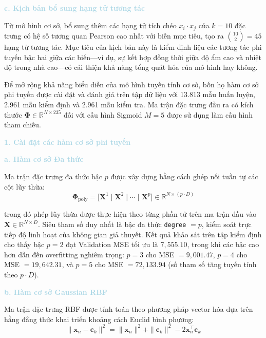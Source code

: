 \noindent\textcolor{lightblue}{\textbf{c. Kịch bản bổ sung hạng tử tương tác}}

Từ mô hình cơ sở, bổ sung thêm các hạng tử tích chéo $x_i \cdot x_j$
của $k=10$ đặc trưng có hệ số tương quan Pearson cao nhất với biến mục
tiêu, tạo ra $\binom{10}{2} = 45$ hạng tử tương tác. Mục tiêu của kịch
bản này là kiểm định liệu các tương tác phi tuyến bậc hai giữa các
biến---ví dụ, sự kết hợp đồng thời giữa độ ẩm cao và nhiệt độ trong nhà
cao---có cải thiện khả năng tổng quát hóa của mô hình hay không.

Để mở rộng khả năng biểu diễn của mô hình tuyến tính cơ sở, bốn họ hàm cơ sở
phi tuyến được cài đặt và đánh giá trên tập dữ liệu với 13.813 mẫu huấn luyện,
2.961 mẫu kiểm định và 2.961 mẫu kiểm tra. Ma trận đặc trưng đầu ra có kích
thước $\boldsymbol{\Phi} \in \mathbb{R}^{N \times 235}$ đối với cấu hình
Sigmoid $M=5$ được sử dụng làm cấu hình tham chiếu.

\noindent\textcolor{lightblue}{\textbf{1. Cài đặt các hàm cơ sở phi tuyến}}

\noindent\textcolor{lightblue}{\textbf{a. Hàm cơ sở Đa thức}}

Ma trận đặc trưng đa thức bậc $p$ được xây dựng bằng cách ghép nối
tuần tự các cột lũy thừa:
$$\boldsymbol{\Phi}_{\mathrm{poly}}
  = \bigl[\mathbf{X}^1 \;\Big|\; \mathbf{X}^2 \;\Big|\; \cdots
  \;\Big|\; \mathbf{X}^p\bigr] \in \mathbb{R}^{N \times (p \cdot D)}$$

trong đó phép lũy thừa được thực hiện theo từng phần tử trên
ma trận đầu vào $\mathbf{X} \in \mathbb{R}^{N \times D}$. Siêu tham số
duy nhất là bậc đa thức \texttt{degree} $= p$, kiểm soát trực tiếp độ
linh hoạt của không gian giả thuyết. Kết quả khảo sát trên tập kiểm định
cho thấy bậc $p = 2$ đạt Validation MSE tối ưu là $7{,}555.10$, trong khi
các bậc cao hơn dẫn đến overfitting nghiêm trọng: $p=3$ cho MSE $= 9{,}001.47$,
$p=4$ cho MSE $= 19{,}642.31$, và $p=5$ cho MSE $= 72{,}133.94$
(số tham số tăng tuyến tính theo $p \cdot D$).

\noindent\textcolor{lightblue}{\textbf{b. Hàm cơ sở Gaussian RBF}}

Ma trận đặc trưng RBF được tính toán theo phương pháp vector hóa
dựa trên hằng đẳng thức khai triển khoảng cách Euclid bình phương:
$$\|\boldsymbol{x}_n - \boldsymbol{c}_k\|^2
  = \|\boldsymbol{x}_n\|^2 + \|\boldsymbol{c}_k\|^2
  - 2\boldsymbol{x}_n^{\top}\boldsymbol{c}_k$$

